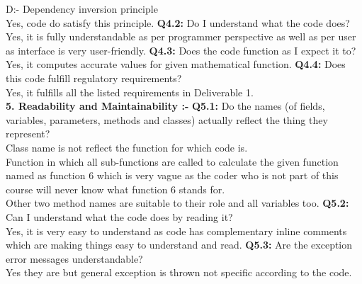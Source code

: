\documentclass[10pt]{article}
\begin{document}
D:- Dependency inversion principle\\
Yes, code do satisfy this principle.
\newline
\textbf{Q4.2:} Do I understand what the code does?\\
Yes, it is fully understandable as per programmer perspective as well as per user as interface is very user-friendly.
\newline
\textbf{Q4.3:} Does the code function as I expect it to? \\
Yes, it computes accurate values for given mathematical function.
\newline
\textbf{Q4.4:} Does this code fulfill regulatory requirements?\\
Yes, it fulfills all the listed requirements in Deliverable 1.\\
\newline
\textbf{5. Readability and Maintainability :-}
 \newline
\textbf{Q5.1:} Do the names (of fields, variables, parameters, methods and classes) actually reflect the thing they represent?\\
Class name is not reflect the function for which code is.\\
Function in which all sub-functions are called to calculate the given function named as function 6 which is very vague as the coder who is not part of this course will never know what function 6 stands for.\\
Other two method names are suitable to their role and all variables too.
\newline
\textbf{Q5.2:} Can I understand what the code does by reading it?\\
Yes, it is very easy to understand as code has complementary inline comments which are making things easy to understand and read.
\newline
\textbf{Q5.3:} Are the exception error messages understandable?\\
Yes they are but general exception is thrown  not specific according to the code.
\end{document}
